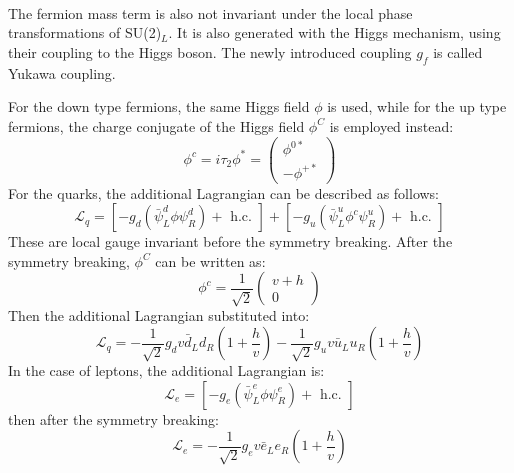 \\ \\
\noindent\textbf{} \\ 
The fermion mass term is also not invariant under the local phase transformations of SU(2)$_L$. It is also generated with the Higgs mechanism, using their coupling to the Higgs boson. The newly introduced coupling $g_f$ is called Yukawa coupling.

For the down type fermions, the same Higgs field $\phi$ is used, while for the up type fermions, the charge conjugate of the Higgs field $\phi^C$ is employed instead:
\begin{equation}
\phi^{c}=i \tau_{2} \phi^{*}=\left(\begin{array}{c}
\phi^{0 *} \\
-\phi^{+*}
\end{array}\right)
\end{equation}
For the quarks, the additional Lagrangian can be described as follows:
\begin{equation}
\mathcal{L}_{q}=\left[-g_{d}\left(\bar{\psi}_{L}^{d} \phi \psi_{R}^{d}\right)+\text { h.c. }\right]+\left[-g_{u}\left(\bar{\psi}_{L}^{u} \phi^{c} \psi_{R}^{u}\right)+\text { h.c. }\right]
\end{equation}
These are local gauge invariant before the symmetry breaking. After the symmetry breaking, $\phi^C$ can be written as:
\begin{equation}
\phi^{c} 
=\frac{1}{\sqrt{2}}\left(\begin{array}{c}
v+h \\
0
\end{array}\right)
\end{equation}
Then the additional Lagrangian substituted into:
\begin{equation}
\mathcal{L}_{q}=-\frac{1}{\sqrt{2}} g_{d} v \bar{d}_{L} d_{R}\left(1+\frac{h}{v}\right)-\frac{1}{\sqrt{2}} g_{u} v \bar{u}_{L} u_{R}\left(1+\frac{h}{v}\right)
\end{equation}
In the case of leptons, the additional Lagrangian is:
\begin{equation}
\mathcal{L}_{e}=\left[-g_{e}\left(\bar{\psi}_{L}^{e} \phi \psi_{R}^{e}\right)+\text { h.c. }\right]
\end{equation}
then after the symmetry breaking:
\begin{equation}
\mathcal{L}_{e}=-\frac{1}{\sqrt{2}} g_{e} v \bar{e}_{L} e_{R}\left(1+\frac{h}{v}\right)
\end{equation}

